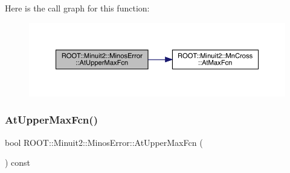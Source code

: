 Here is the call graph for this function\+:
\nopagebreak
\begin{figure}[H]
\begin{center}
\leavevmode
\includegraphics[width=350pt]{d2/dd1/classROOT_1_1Minuit2_1_1MinosError_a940c974f6ac87d22c4d340ef2fc88e8c_cgraph}
\end{center}
\end{figure}
\mbox{\label{classROOT_1_1Minuit2_1_1MinosError_a940c974f6ac87d22c4d340ef2fc88e8c}} 
\subsubsection{\texorpdfstring{AtUpperMaxFcn()}{AtUpperMaxFcn()}\hspace{0.1cm}{\footnotesize\ttfamily [3/3]}}
{\footnotesize\ttfamily bool R\+O\+O\+T\+::\+Minuit2\+::\+Minos\+Error\+::\+At\+Upper\+Max\+Fcn (\begin{DoxyParamCaption}{ }\end{DoxyParamCaption}) const\hspace{0.3cm}{\ttfamily [inline]}}

